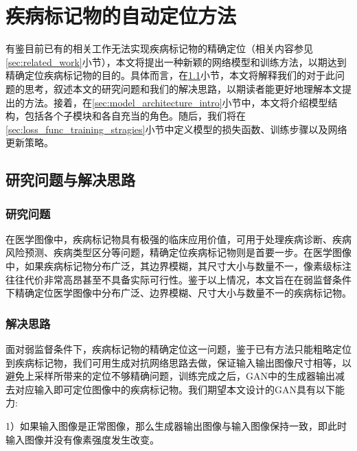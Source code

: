 \chapter{疾病标记物的自动定位方法}\label{sec:method}
有鉴目前已有的相关工作无法实现疾病标记物的精确定位（相关内容参见\ref{sec:related_work}小节），本文将提出一种新颖的网络模型和训练方法，以期达到精确定位疾病标记物的目的。具体而言，在\ref{sec:idea_thinking}小节，本文将解释我们的对于此问题的思考，叙述本文的研究问题和我们的解决思路，以期读者能更好地理解本文提出的方法。接着，在\ref{sec:model_architecture_intro}小节中，本文将介绍模型结构，包括各个子模块和各自充当的角色。随后，我们将在\ref{sec:loss_func_training_stragies}小节中定义模型的损失函数、训练步骤以及网络更新策略。

\section{研究问题与解决思路}\label{sec:idea_thinking}
\subsection{研究问题}
在医学图像中，疾病标记物具有极强的临床应用价值，可用于处理疾病诊断、疾病风险预测、疾病类型区分等问题，精确定位疾病标记物则是首要一步。在医学图像中，如果疾病标记物分布广泛，其边界模糊，其尺寸大小与数量不一，像素级标注往往代价非常高昂甚至不具备实际可行性。鉴于以上情况，本文旨在在弱监督条件下精确定位医学图像中分布广泛、边界模糊、尺寸大小与数量不一的疾病标记物。
\subsection{解决思路}
面对弱监督条件下，疾病标记物的精确定位这一问题，鉴于已有方法只能粗略定位到疾病标记物，我们可用生成对抗网络思路去做，保证输入输出图像尺寸相等，以避免上采样所带来的定位不够精确问题，训练完成之后，GAN中的生成器输出减去对应输入即可定位图像中的疾病标记物。我们期望本文设计的GAN具有以下能力:

1）如果输入图像是正常图像，那么生成器输出图像与输入图像保持一致，即此时输入图像并没有像素强度发生改变。
	
